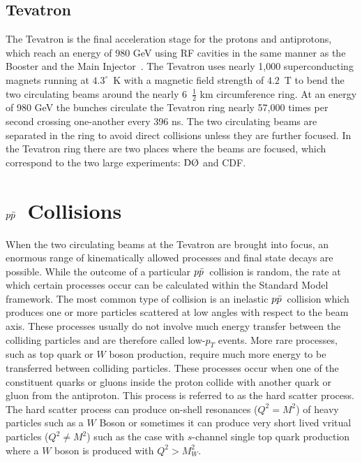 \subsection{Tevatron}

The Tevatron is the final acceleration stage for the protons and antiprotons, which reach an energy of 980 GeV using RF cavities in the same manner as the Booster and the Main Injector~\cite{tevatron}. The Tevatron uses nearly 1,000 superconducting magnets running at $4.3^{\circ}$~K with a magnetic field strength of $4.2$~T to bend the two circulating beams around the nearly 6~$\frac{1}{2}$ km circumference ring. At an energy of 980 GeV the bunches circulate the Tevatron ring nearly 57,000 times per second crossing one-another every 396 ns. The two circulating beams are separated in the ring to avoid direct collisions unless they are further focused. In the Tevatron ring there are two places where the beams are focused, which correspond to the two large experiments: $\dzero$ and CDF.

\section{$\mbox{$p\bar{p}$}$~Collisions}
\label{ppbarcollisions}

When the two circulating beams at the Tevatron are brought into focus, an enormous range of kinematically allowed processes and final state decays are possible. While the outcome of a particular $\mbox{$p\bar{p}$}$~collision is random, the rate at which certain processes occur can be calculated within the Standard Model framework. The most common type of collision is an inelastic $\mbox{$p\bar{p}$}$~collision which produces one or more particles scattered at low angles with respect to the beam axis. These processes usually do not involve much energy transfer between the colliding particles and are therefore called low-$p_{T}$ events. More rare processes, such as top quark or $W$ boson production, require much more energy to be transferred between colliding particles. These processes occur when one of the constituent quarks or gluons inside the proton collide with another quark or gluon from the antiproton. This process is referred to as the hard scatter process. The hard scatter process can produce on-shell resonances ($Q^{2} = M^{2}$) of heavy particles such as a $W$ Boson or sometimes it can produce very short lived vritual particles ($Q^{2} \neq M^{2}$) such as the case with $s$-channel single top quark production where a $W$ boson is produced with $Q^{2} > M_{W}^{2}$.

